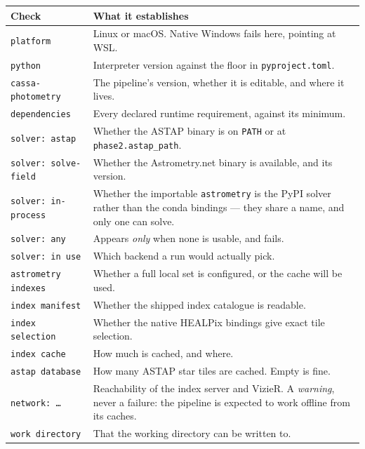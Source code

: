 \documentclass[11pt,a4paper]{article}
\begin{document}
\begin{center}
\begin{tabularx}{\textwidth}{|l|X|}
\hline
\textbf{Check} & \textbf{What it establishes} \\
\hline
\texttt{platform} & Linux or macOS. Native Windows fails here, pointing at WSL. \\
\hline
\texttt{python} & Interpreter version against the floor in \texttt{pyproject.toml}. \\
\hline
\texttt{cassa-photometry} & The pipeline's version, whether it is editable, and where it lives. \\
\hline
\texttt{dependencies} & Every declared runtime requirement, against its minimum. \\
\hline
\texttt{solver: astap} & Whether the ASTAP binary is on \texttt{PATH} or at \texttt{phase2.astap\_path}. \\
\hline
\texttt{solver: solve-field} & Whether the Astrometry.net binary is available, and its version. \\
\hline
\texttt{solver: in-process} & Whether the importable \texttt{astrometry} is the PyPI solver rather than the conda bindings --- they share a name, and only one can solve. \\
\hline
\texttt{solver: any} & Appears \emph{only} when none is usable, and fails. \\
\hline
\texttt{solver: in use} & Which backend a run would actually pick. \\
\hline
\texttt{astrometry indexes} & Whether a full local set is configured, or the cache will be used. \\
\hline
\texttt{index manifest} & Whether the shipped index catalogue is readable. \\
\hline
\texttt{index selection} & Whether the native HEALPix bindings give exact tile selection. \\
\hline
\texttt{index cache} & How much is cached, and where. \\
\hline
\texttt{astap database} & How many ASTAP star tiles are cached. Empty is fine. \\
\hline
\texttt{network: \ldots} & Reachability of the index server and VizieR. A \emph{warning}, never a failure: the pipeline is expected to work offline from its caches. \\
\hline
\texttt{work directory} & That the working directory can be written to. \\
\hline
\end{tabularx}
\end{center}
\end{document}
